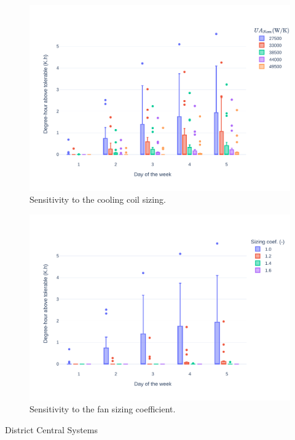 \begin{figure}[!htbp]
\centering
\includegraphics[width=\linewidth]{../python_scripts/figures/CoilSizing.pdf}
\caption{Sensitivity to the cooling coil sizing.}
\label{fig:coil}
\end{figure}

\begin{figure}[!htbp]
\centering
\includegraphics[width=\linewidth]{../python_scripts/figures/FanSizing.pdf}
\caption{Sensitivity to the fan sizing coefficient.}
\label{fig:fan}
\end{figure}

District Central Systems


